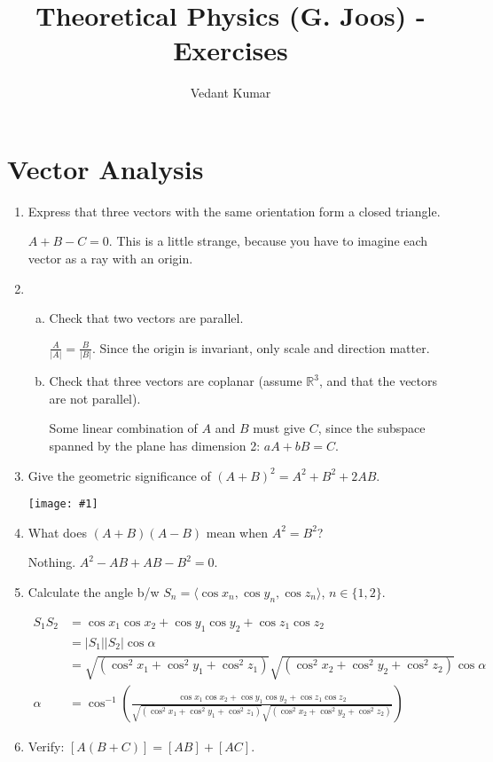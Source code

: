 \documentclass{article}
\title{Theoretical Physics (G. Joos) - Exercises}
\author{Vedant Kumar}
\newcommand{\R}{\mathbb{R}}
\newcommand{\tuple}[1]{\langle #1 \rangle}
\newcommand{\centeredimage}[1]{\begin{center}\texttt{[image: \#1]}\end{center}}
\begin{document}
\maketitle

\section{Vector Analysis}

\begin{enumerate}[1)]
    \item Express that three vectors with the same orientation form a closed
        triangle.
        
        $A + B - C = 0$. This is a little strange, because you have to
        imagine each vector as a ray with an origin.
    \item
        \begin{enumerate}[a)]
            \item Check that two vectors are parallel.
                
                $\frac{A}{|A|} = \frac{B}{|B|}$. Since the origin is
                invariant, only scale and direction matter.
            \item Check that three vectors are coplanar (assume $\R^3$, and
                that the vectors are not parallel).
                
                Some linear combination of $A$ and $B$ must give $C$, since
                the subspace spanned by the plane has dimension 2:
                $aA + bB = C$. 
        \end{enumerate}
    \item Give the geometric significance of $(A+B)^2 = A^2 + B^2 + 2AB$.

        \centeredimage{p1-3}
    \item What does $(A+B)(A-B)$ mean when $A^2=B^2$?

        Nothing. $A^2 - AB + AB - B^2 = 0$.
    \item Calculate the angle b/w $S_n = \tuple{\cos x_n, \cos y_n, \cos
        z_n}$, $n \in \{1, 2\}$.

        \begin{align*}
            S_1S_2 &= \cos x_1\cos x_2 + \cos y_1\cos y_2 + \cos z_1\cos z_2
                      \\
                   &= |S_1||S_2|\cos \alpha \\
                   &= \sqrt{(\cos^2 x_1 + \cos^2 y_1 + \cos^2 z_1)}
                      \sqrt{(\cos^2 x_2 + \cos^2 y_2 + \cos^2 z_2)}
                      \cos \alpha \\
            \alpha &= \cos^{-1}\left( \frac{
                \cos x_1\cos x_2 + \cos y_1\cos y_2 + \cos z_1\cos z_2
            }{
                \sqrt{(\cos^2 x_1 + \cos^2 y_1 + \cos^2 z_1)}
                \sqrt{(\cos^2 x_2 + \cos^2 y_2 + \cos^2 z_2)}
            } \right)
        \end{align*}
    \item Verify: $[A(B+C)] = [AB] + [AC]$. 


\end{enumerate}
\end{document}
